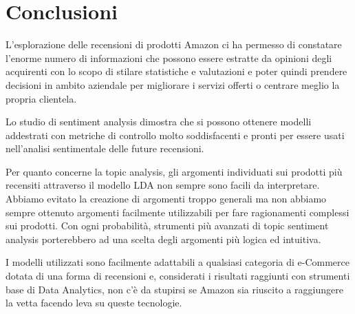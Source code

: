 \chapter{Conclusioni}
L'esplorazione delle recensioni di prodotti Amazon ci ha permesso di constatare l'enorme numero di informazioni che possono essere estratte da opinioni degli acquirenti con lo scopo di stilare statistiche e valutazioni e poter quindi prendere decisioni in ambito aziendale per migliorare i servizi offerti o centrare meglio la propria clientela.
\par
Lo studio di sentiment analysis dimostra che si possono ottenere modelli addestrati con metriche di controllo molto soddisfacenti e pronti per essere usati nell'analisi sentimentale delle future recensioni.
\par
Per quanto concerne la topic analysis, gli argomenti individuati sui prodotti più recensiti attraverso il modello LDA non sempre sono facili da interpretare. Abbiamo evitato la creazione di argomenti troppo generali ma non abbiamo sempre ottenuto argomenti facilmente utilizzabili per fare ragionamenti complessi sui prodotti. Con ogni probabilità, strumenti più avanzati di topic sentiment analysis porterebbero ad una scelta degli argomenti più logica ed intuitiva.
\par
I modelli utilizzati sono facilmente adattabili a qualsiasi categoria di e-Commerce dotata di una forma di recensioni e, considerati i risultati raggiunti con strumenti base di Data Analytics, non c'è da stupirsi se Amazon sia riuscito a raggiungere la vetta facendo leva su queste tecnologie.